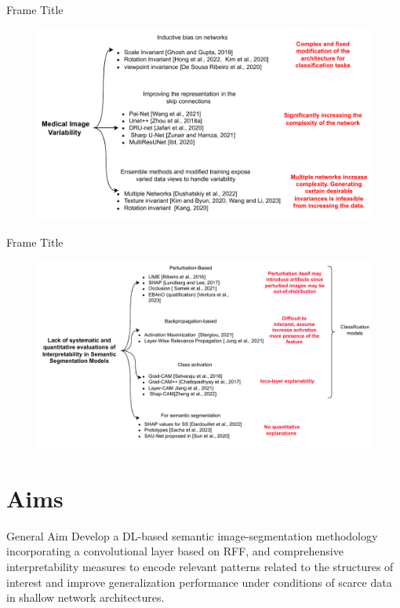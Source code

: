 \documentclass[aspectratio=169]{beamer}
\begin{document}
\begin{frame}{Frame Title}
\begin{figure}
    \centering
    \includegraphics[width=0.8\linewidth]{Figures/State-of-the-ar-obj2.pdf}
\end{figure}    
\end{frame}


\begin{frame}{Frame Title}
\begin{figure}
    \centering
    \includegraphics[width=0.8\linewidth]{Figures/State-of-the-ar-obj3.pdf}
\end{figure}    
\end{frame}



\section{Aims}

\begin{frame}{General Aim}
    Develop a DL-based semantic image-segmentation methodology incorporating a convolutional layer based on RFF, and comprehensive interpretability measures to encode relevant patterns related to the structures of interest and improve generalization performance under conditions of scarce data in shallow network architectures.
\end{frame}
\end{document}
